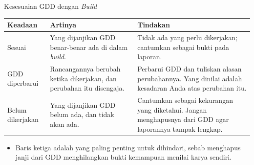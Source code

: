\documentclass[aspectratio=169,10pt]{beamer}
\begin{document}
\begin{frame}{Kesesuaian GDD dengan \emph{Build}}
{\scriptsize
\renewcommand{\arraystretch}{1.12}
\begin{tabularx}{\textwidth}{@{}>{\raggedright\arraybackslash}p{2.75cm}
    >{\raggedright\arraybackslash}X
    >{\raggedright\arraybackslash}X@{}}
\toprule
\textbf{Keadaan} & \textbf{Artinya} & \textbf{Tindakan} \\
\midrule
Sesuai & Yang dijanjikan GDD benar-benar ada di dalam \emph{build}. &
  Tidak ada yang perlu dikerjakan; cantumkan sebagai bukti pada laporan. \\
\addlinespace
GDD diperbarui & Rancangannya berubah ketika dikerjakan, dan perubahan itu
  disengaja. & Perbarui GDD dan tuliskan alasan perubahannya. Yang dinilai
  adalah kesadaran Anda atas perubahan itu. \\
\addlinespace
Belum dikerjakan & Yang dijanjikan GDD belum ada, dan tidak akan ada. &
  Cantumkan sebagai kekurangan yang diketahui. Jangan menghapusnya dari GDD
  agar laporannya tampak lengkap. \\
\bottomrule
\end{tabularx}}
\vspace{0.12cm}
\begin{itemize}
  \item Baris ketiga adalah yang paling penting untuk dihindari, sebab
        menghapus janji dari GDD menghilangkan bukti kemampuan menilai karya
        sendiri.
\end{itemize}
\end{frame}
\end{document}

